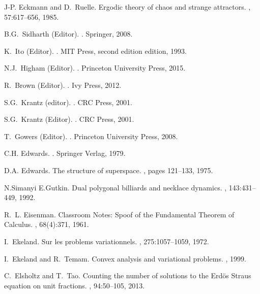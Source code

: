 \documentclass[12pt]{amsart}
\begin{document}
\begin{thebibliography}{100}
J-P. Eckmann and D.~Ruelle.
\newblock Ergodic theory of chaos and strange attractors.
, 57:617--656, 1985.

B.G.~Sidharth (Editor).
.
\newblock Springer, 2008.

K.~Ito (Editor).
.
\newblock MIT Press, second edition edition, 1993.

N.J.~Higham (Editor).
.
\newblock Princeton University Press, 2015.

R.~Brown (Editor).
.
\newblock Ivy Press, 2012.

S.G.~Krantz (editor).
.
\newblock CRC Press, 2001.

S.G.~Krantz (Editor).
.
\newblock CRC Press, 2001.

T.~Gowers (Editor).
.
\newblock Princeton University Press, 2008.

C.H. Edwards.
.
\newblock Springer Verlag, 1979.

D.A. Edwards.
\newblock The structure of superspace.
, pages 121--133, 1975.

N.Simanyi E.Gutkin.
\newblock Dual polygonal billiards and necklace dynamics.
, 143:431--449, 1992.

R.~L. Eisenman.
\newblock Classroom {N}otes: {S}poof of the {F}undamental {T}heorem of
  {C}alculus.
, 68(4):371, 1961.

I.~Ekeland.
\newblock Sur les problems variationnels.
, 275:1057--1059, 1972.

I.~Ekeland and R.~Temam.
\newblock Convex analysis and variational problems.
, 1999.

C.~Elsholtz and T.~Tao.
\newblock Counting the number of solutions to the {Erd\"os Straus} equation on
  unit fractions.
, 94:50--105,
  2013.


\end{thebibliography}
\end{document}
